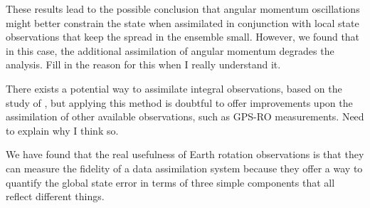 These results lead to the possible conclusion that angular momentum oscillations might better constrain the state when assimilated in conjunction with local state observations that keep the spread in the ensemble small. 
However, we found that in this case, the additional assimilation of angular momentum degrades the analysis.    
\textcolor{alert}{Fill in the reason for this when I really understand it.}

There exists a potential way to assimilate integral observations, based on the study of \citet{Dirren2005}, but applying this method is doubtful to offer improvements upon the assimilation of other available observations, such as GPS-RO measurements.  
\textcolor{alert}{Need to explain why I think so.}


We have found that the real usefulness of Earth rotation observations is that they can measure the 
fidelity of a data assimilation system because they offer a  way to quantify the global state error in terms of three simple components that all reflect different things.  

